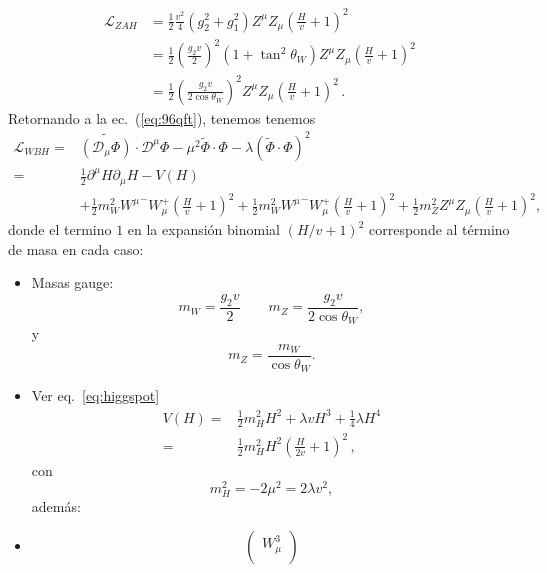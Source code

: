 \begin{frame}
\begin{align}
  \mathcal{L}_{ZAH}&=\frac{1}{2}\frac{v^2}{4}\left(g_2^2+g_1^2\right)Z^\mu Z_\mu
  \left(\frac{H}{v}+1\right)^2\nonumber\\
 &=\frac{1}{2}\left(\frac{g_2v}{2}\right)^2\left(1+\tan^2\theta_W\right)Z^\mu Z_\mu
             \left(\frac{H}{v}+1\right)^2\nonumber\\
   &=\frac{1}{2}\left(\frac{g_2v}{2\cos\theta_W}\right)^2Z^\mu Z_\mu\left(\frac{H}{v}+1\right)^2\,.
\end{align}
Retornando a la ec.~(\ref{eq:96qft}), tenemos
tenemos
\begin{align}
  \label{eq:lwbhfin}
  \mathcal{L}_{W B H}=&\widetilde{\left( \mathcal{D}_\mu{\Phi} \right)}\cdot\mathcal{D}^\mu\Phi-\mu^2\widetilde{\Phi}\cdot\Phi-\lambda \left( \widetilde{\Phi}\cdot\Phi \right)^2 \nonumber\\
  =&\frac{1}{2}\partial^\mu H\partial_\mu H-V(H)\nonumber\\
  &+\frac{1}{2}m_W^2{W^\mu}^-W_\mu^+ \left(\frac{H}{v}+1 \right)^2
    +\frac{1}{2}m_W^2{W^\mu}^-W_\mu^+\left(\frac{H}{v}+1 \right)^2
    +\frac{1}{2}m_Z^2Z^\mu Z_\mu\left(\frac{H}{v}+1 \right)^2,
\end{align}
donde el termino $1$ en la expansión binomial $\left({H}/{v}+1 \right)^2$ corresponde al
término de masa en cada caso:
\begin{itemize} %
\item Masas gauge:
\begin{equation}
\label{eq:mwz}
  m_W=\frac{g_2v}{2}
  \qquad 
  m_Z=\frac{g_2v}{2\cos\theta_W},
\end{equation}
y
\begin{equation}
\label{eq:mwzw}
  m_Z=\frac{m_W}{\cos\theta_W}.
\end{equation}
\item Ver eq.~\eqref{eq:higgspot}
  \begin{align}
    V(H)=&\tfrac{1}{2}m_H^2H^2+\lambda vH^3+\tfrac{1}{4}\lambda H^4\nonumber\\
    =&\frac{1}{2}m_H^2 H^2\left( \frac{H}{2v}+ 1 \right)^2\,,
  \end{align}
con
\begin{equation}
  m_H^2=-2\mu^2=2\lambda v^2,
\end{equation}
además:
\item 
\begin{equation}
\label{eq:azmix}
  \begin{pmatrix}
    W^3_\mu\\

\end{pmatrix}
\end{equation}
\end{itemize}
\end{frame}
